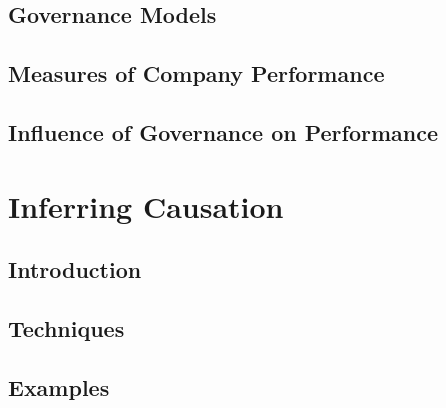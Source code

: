 \subsection{Governance Models}
\subsection{Measures of Company Performance}
\subsection{Influence of Governance on Performance}
\section{Inferring Causation}
\subsection{Introduction}
\subsection{Techniques}
\subsection{Examples}